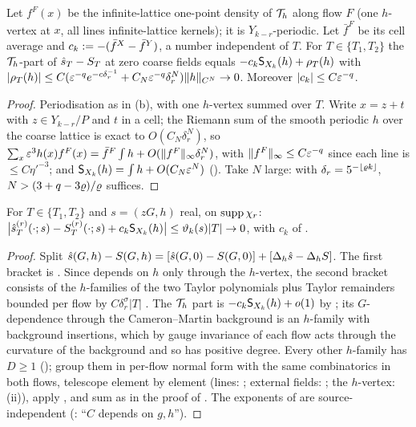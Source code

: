 \begin{lemma}\label{rot:lem:C}
Let $f^F(x)$ be the infinite-lattice one-point density of $\mathcal T_h$ along flow $F$ (one $h$-vertex at $x$, all lines infinite-lattice kernels); it is $Y_{k-r}$-periodic. Let $\bar f^F$ be its cell average and $c_k:=-(\bar f^X-\bar f^Y)$, a number independent of $T$. For $T\in\{T_1,T_2\}$ the $\mathcal T_h$-part of $\hat s_T-S_T$ at zero coarse fields equals $-c_k\mathsf S_{X_k}(h)+\rho_T(h)$ with $|\rho_T(h)|\le C(\varepsilon^{-q}e^{-c\delta_r^{-1}}+C_N\varepsilon^{-q}\delta_r^N)\|h\|_{C^N}\to0$. Moreover $|c_k|\le C\varepsilon^{-q}$.
\end{lemma}
\begin{proof}
Periodisation as in (b), with one $h$-vertex summed over $T$. Write $x=z+t$ with $z\in Y_{k-r}/P$ and $t$ in a cell; the Riemann sum of the smooth periodic $h$ over the coarse lattice is exact to $O(C_N\delta_r^N)$, so $\sum_x\varepsilon^3h(x)f^F(x)=\bar f^F\int h+O(\|f^F\|_\infty\delta_r^N)$, with $\|f^F\|_\infty\le C\varepsilon^{-q}$ since each line is $\le C\eta'^{-3}$; and $\mathsf S_{X_k}(h)=\int h+O(C_N\varepsilon^N)$ (). Take $N$ large: with $\delta_r=5^{-\lfloor\varrho k\rfloor}$, $N>(3+q-3\varrho)/\varrho$ suffices.
\end{proof}

\begin{theorem}\label{rot:thm:Asrc}
For $T\in\{T_1,T_2\}$ and $s=(zG,h)$ real, on $\operatorname{supp}\chi_r$: $\big|\hat s^{(r)}_T(\cdot;s)-S^{(r)}_T(\cdot;s)+c_k\mathsf S_{X_k}(h)\big|\le\vartheta_k(s)|T|\to0$, with $c_k$ of .
\end{theorem}
\begin{proof}
Split $\hat s(G,h)-S(G,h)=[\hat s(G,0)-S(G,0)]+[\Delta_h\hat s-\Delta_hS]$. The first bracket is . Since \cite[(3.17)]{K1} depends on $h$ only through the $h$-vertex, the second bracket consists of the $h$-families of the two Taylor polynomials plus Taylor remainders bounded per flow by $C\delta_r^\sigma|T|$ \cite[p.~665]{K1}. The $\mathcal T_h$ part is $-c_k\mathsf S_{X_k}(h)+o(1)$ by ; its $G$-dependence through the Cameron--Martin background is an $h$-family with background insertions, which by gauge invariance of each flow acts through the curvature of the background and so has positive degree. Every other $h$-family has $D\ge1$ (); group them in per-flow normal form with the same combinatorics in both flows, telescope element by element (lines: ; external fields: ; the $h$-vertex: (ii)), apply , and sum as in the proof of . The exponents of  are source-independent (\cite[Thm.~3.4]{K1}: ``$C$ depends on $g,h$'').
\end{proof}
